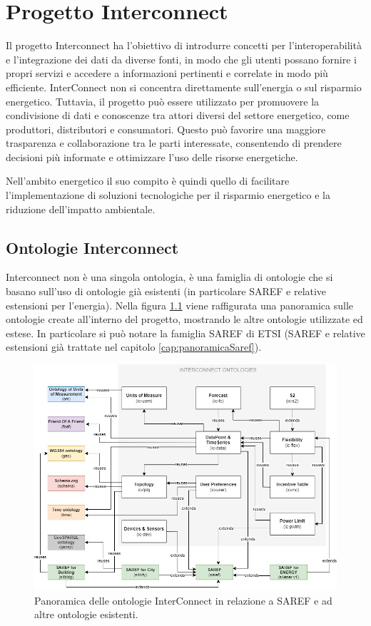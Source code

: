 \chapter{Progetto Interconnect}

Il progetto Interconnect \cite{interconnect} ha l'obiettivo di introdurre concetti per l'interoperabilità e l'integrazione dei dati da diverse fonti, in modo che gli utenti possano fornire i propri servizi e accedere a informazioni pertinenti e correlate in modo più efficiente.
InterConnect non si concentra direttamente sull'energia o sul risparmio energetico. Tuttavia, il progetto può essere utilizzato per promuovere la condivisione di dati e conoscenze tra attori diversi del settore energetico, come produttori, distributori e consumatori. Questo può favorire una maggiore trasparenza e collaborazione tra le parti interessate, consentendo di prendere decisioni più informate e ottimizzare l'uso delle risorse energetiche.

Nell'ambito energetico il suo compito è quindi quello di facilitare l'implementazione di soluzioni tecnologiche per il risparmio energetico e la riduzione dell'impatto ambientale.


\section{Ontologie Interconnect}
Interconnect non è una singola ontologia, è una famiglia di ontologie che si basano sull'uso di ontologie già esistenti (in particolare SAREF e relative estensioni per l'energia).
Nella figura \ref{fig:panoramicaInterconnect} viene raffigurata una panoramica sulle ontologie create all'interno del progetto, mostrando le altre ontologie utilizzate ed estese. In particolare si può notare la famiglia SAREF di ETSI (SAREF e relative estensioni già trattate nel capitolo \ref{cap:panoramicaSaref}).
\begin{figure}[H]
    \centering
    \includegraphics[width=\textwidth]{figures/panoramicaInterconnect.png}
    \caption{Panoramica delle ontologie InterConnect in relazione a SAREF e ad altre ontologie esistenti.}
    \label{fig:panoramicaInterconnect}
\end{figure}

